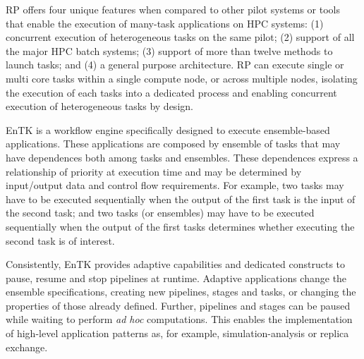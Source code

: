 \documentclass[preprint,12pt, a4paper]{elsarticle}
\begin{document}
RP offers four unique features when compared to other pilot systems or tools
that enable the execution of many-task applications on HPC systems: (1)
concurrent execution of heterogeneous tasks on the same pilot; (2) support of
all the major HPC batch systems; (3) support of more than twelve methods to
launch tasks; and (4) a general purpose architecture. RP can execute single
or multi core tasks within a single compute node, or across multiple nodes,
isolating the execution of each tasks into a dedicated process and enabling
concurrent execution of heterogeneous tasks by design.

EnTK is a workflow engine specifically designed to execute ensemble-based
applications. These applications are composed by ensemble of tasks that may
have dependences both among tasks and ensembles. These dependences express a relationship of
priority at execution time and may be determined by input/output data and
control flow requirements. For example, two tasks may have to be executed
sequentially when the output of the first task is the input of the second
task; and two tasks (or ensembles) may have to be executed sequentially when
the output of the first tasks determines whether executing the second task is
of interest.

Consistently, EnTK provides adaptive capabilities and dedicated constructs to
pause, resume and stop pipelines at runtime. Adaptive applications change the
ensemble specifications, creating new pipelines, stages and tasks, or
changing the properties of those already defined. Further, pipelines and
stages can be paused while waiting to perform \textit{ad hoc} computations.
This enables the implementation of high-level application patterns as, for
example, simulation-analysis or replica exchange.






\end{document}
